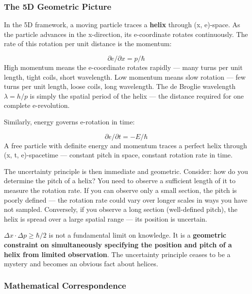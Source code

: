 \documentclass[aps,prd,preprint,superscriptaddress,longbibliography,floatfix]{revtex4-2}
\theoremstyle{remark}
\begin{document}
\subsubsection{The 5D Geometric Picture}

In the 5D framework, a moving particle traces a \textbf{helix} through (x, e)-space. As the particle advances in the x-direction, its e-coordinate rotates continuously. The rate of this rotation per unit distance is the momentum:


\begin{equation}
    \partial e/\partial x = p/\hbar
\end{equation}
High momentum means the e-coordinate rotates rapidly --- many turns per unit length, tight coils, short wavelength. Low momentum means slow rotation --- few turns per unit length, loose coils, long wavelength. The de Broglie wavelength $\lambda = h/p$ is simply the spatial period of the helix --- the distance required for one complete e-revolution.

Similarly, energy governs e-rotation in time:


\begin{equation}
    \partial e/\partial t = -E/\hbar
\end{equation}
A free particle with definite energy and momentum traces a perfect helix through (x, t, e)-spacetime --- constant pitch in space, constant rotation rate in time.

The uncertainty principle is then immediate and geometric. Consider: how do you determine the pitch of a helix? You need to observe a sufficient length of it to measure the rotation rate. If you can observe only a small section, the pitch is poorly defined --- the rotation rate could vary over longer scales in ways you have not sampled. Conversely, if you observe a long section (well-defined pitch), the helix is spread over a large spatial range --- its position is uncertain.

$\Delta x \cdot \Delta p \geq \hbar/2$ is not a fundamental limit on knowledge. It is a \textbf{geometric constraint on simultaneously specifying the position and pitch of a helix from limited observation}. The uncertainty principle ceases to be a mystery and becomes an obvious fact about helices.


\subsubsection{Mathematical Correspondence}
\end{document}
